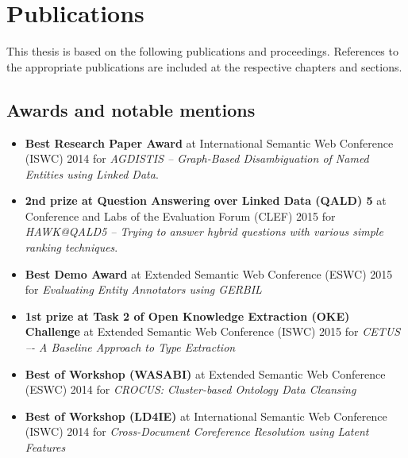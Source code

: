 \chapter*{Publications}

This thesis is based on the following publications and proceedings.
References to the appropriate publications are included at the respective chapters and sections.

\bigskip


\section*{Awards and notable mentions}
\begin{itemize}
    \item \textbf{Best Research Paper Award} at International Semantic Web Conference (ISWC) 2014 for \textit{AGDISTIS -- Graph-Based Disambiguation of Named Entities using Linked Data}.
    \item \textbf{2nd prize at Question Answering over Linked Data (QALD) 5} at Conference and Labs of the Evaluation Forum (CLEF) 2015 for \textit{HAWK@QALD5 -- Trying to answer hybrid questions with various simple ranking techniques}.
    \item \textbf{Best Demo Award} at Extended Semantic Web Conference (ESWC) 2015 for \textit{Evaluating Entity Annotators using GERBIL}
    \item \textbf{1st prize at Task 2 of Open Knowledge Extraction (OKE) Challenge} at Extended Semantic Web Conference (ISWC) 2015 for \textit{CETUS –- A Baseline Approach to Type Extraction}
    \item \textbf{Best of Workshop (WASABI)} at Extended Semantic Web Conference (ESWC) 2014 for \textit{CROCUS: Cluster-based Ontology Data Cleansing}
    \item \textbf{Best of Workshop (LD4IE)} at International Semantic Web Conference (ISWC) 2014 for \textit{Cross-Document Coreference Resolution using Latent Features} 
\end{itemize}

